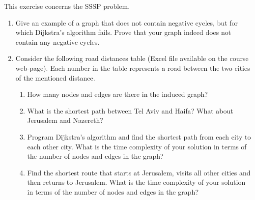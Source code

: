 \begin{exercise}This exercise concerns the SSSP problem.

\begin{enumerate}
  \item Give an example of a graph that does not contain negative cycles, but for which Dijkstra's algorithm fails. Prove that your graph indeed does not contain any negative cycles.
  \item Consider the following road distances table (Excel file available on the course web-page). Each number in the table represents a road between the two cities of the mentioned distance.
\begin{table}[]
\centering
{}
\caption{City-distances}
\end{table}
  \begin{enumerate}
    \item How many nodes and edges are there in the induced graph?
    \item What is the shortest path between Tel Aviv and Haifa? What about Jerusalem and Nazereth?
    \item Program Dijkstra's algorithm and find the shortest path from each city to each other city. What is the time complexity of your solution in terms of the number of nodes and edges in the graph?
    \item Find the shortest route that starts at Jerusalem, visits all other cities and then returns to Jerusalem. What is the time complexity of your solution in terms of the number of nodes and edges in the graph?
  \end{enumerate}
\end{enumerate}
\end{exercise}